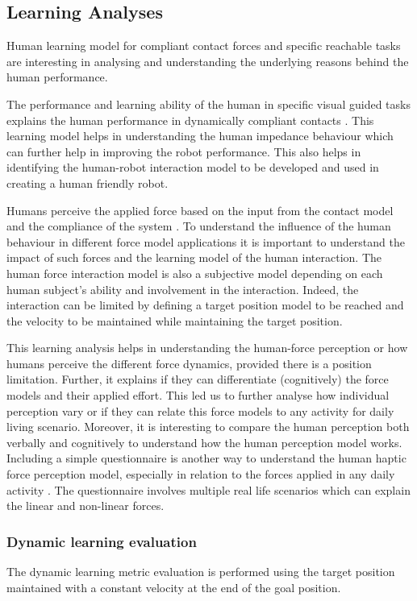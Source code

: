 \subsection{Learning Analyses}
Human learning model for compliant contact forces and specific reachable tasks are interesting in analysing and understanding the underlying reasons behind the human performance. 

The performance and learning ability of the human in specific visual guided tasks explains the human performance in dynamically compliant contacts \cite{ernst2002}. This learning model helps in understanding the human impedance behaviour which can further help in improving the robot performance. This also helps in identifying the human-robot interaction model to be developed and used in creating a human friendly robot. 

Humans perceive the applied force based on the input from the contact model and the compliance of the system \cite{pongrac2006}. To understand the influence of the human behaviour in different force model applications it is important to understand the impact of such forces and the learning model of the human interaction. The human force interaction model is also a subjective model depending on  each human subject’s ability and involvement in the interaction. Indeed, the interaction can be limited by defining a target position model to be reached and the velocity to be maintained while maintaining the target position.

This learning analysis helps in understanding the human-force perception or how humans perceive the different force dynamics, provided there is a position limitation. Further, it explains if they can differentiate (cognitively) the force models and their applied effort. This led us to further analyse how individual perception vary or if they can relate this force models to any activity for daily living scenario. Moreover, it is interesting to compare the human perception both verbally and cognitively to understand how the human perception model works. Including a simple questionnaire is another way to understand the human haptic force perception model, especially in relation to the forces applied in any daily activity \cite{van2014}. The questionnaire involves multiple real life scenarios which can explain the linear and non-linear forces.

\subsubsection*{Dynamic learning evaluation}
The dynamic learning metric evaluation is performed using the target position maintained with a constant velocity at the end of the goal position.

